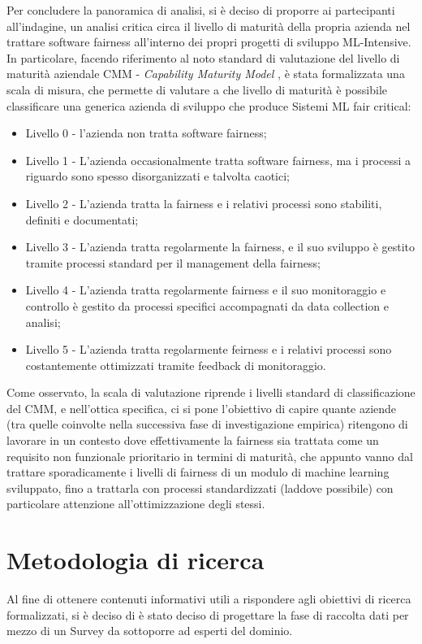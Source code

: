      Per concludere la panoramica di analisi, si è deciso di proporre ai partecipanti all'indagine, un analisi critica circa il livello di maturità della propria azienda nel trattare software fairness all'interno dei propri progetti di sviluppo ML-Intensive. In particolare, facendo riferimento al noto standard di valutazione del livello di maturità aziendale CMM - \emph{Capability Maturity Model} \cite{CMM}, è stata formalizzata una scala di misura, che permette di valutare a che livello di maturità è possibile classificare una generica azienda di sviluppo che produce Sistemi ML fair critical:
     
     \begin{itemize}
     	\item Livello 0 - l'azienda non tratta software fairness;
     	\item Livello 1 - L'azienda occasionalmente tratta software fairness, ma i processi a riguardo sono spesso disorganizzati e talvolta caotici;
     	\item Livello 2 - L'azienda tratta la fairness e i relativi processi sono stabiliti, definiti e documentati;
     	\item Livello 3 - L'azienda tratta regolarmente la fairness, e il suo sviluppo è gestito tramite processi standard per il management della fairness;
     	\item Livello 4 - L'azienda tratta regolarmente fairness e il suo monitoraggio e controllo è gestito da processi specifici accompagnati da data collection e analisi;
     	\item Livello 5 - L'azienda tratta regolarmente feirness e i relativi processi sono costantemente ottimizzati tramite feedback di monitoraggio.
     \end{itemize}
 
 	Come osservato, la scala di valutazione riprende i livelli standard di classificazione del CMM, e nell'ottica specifica, ci si pone l'obiettivo di capire quante aziende (tra quelle coinvolte nella successiva fase di investigazione empirica) ritengono di lavorare in un contesto dove effettivamente la fairness sia trattata come un requisito non funzionale prioritario in termini di maturità, che appunto vanno dal trattare sporadicamente i livelli di fairness di un modulo di machine learning sviluppato, fino a trattarla con processi standardizzati (laddove possibile) con particolare attenzione all'ottimizzazione degli stessi.
    
    \section{Metodologia di ricerca}
     Al fine di ottenere contenuti informativi utili a rispondere agli obiettivi di ricerca formalizzati, si è deciso di è stato deciso di progettare la fase di raccolta dati per mezzo di un Survey da sottoporre ad esperti del dominio.\\\\
     

